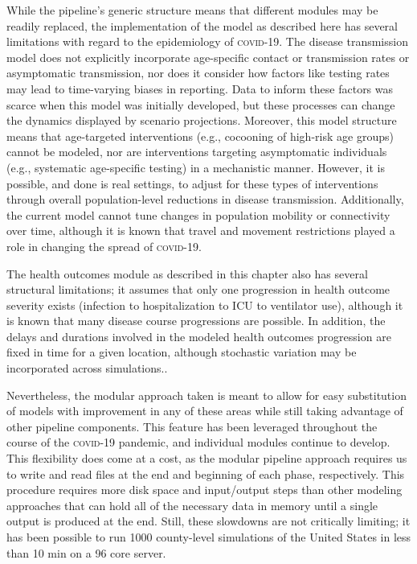 While the pipeline’s generic structure means that different modules may be readily replaced, the implementation of the model as described here has several limitations with regard to the epidemiology of \textsc{covid}-19. The disease transmission model does not explicitly incorporate age-specific contact or transmission rates or asymptomatic transmission, nor does it consider how factors like testing rates may lead to time-varying biases in reporting. Data to inform these factors was scarce when this model was initially developed, but these processes can change the dynamics displayed by scenario projections. Moreover, this model structure means that age-targeted interventions  (e.g., cocooning of high-risk age groups) cannot be modeled, nor are interventions targeting asymptomatic individuals (e.g., systematic age-specific testing) in a mechanistic manner. However, it is possible, and done is real settings, to adjust for these types of interventions through overall population-level reductions in disease transmission. Additionally, the current model cannot tune changes in population mobility or connectivity over time, although it is known that travel and movement restrictions played a role in changing the spread of \textsc{covid}-19.

The health outcomes module as described in this chapter also has several structural limitations; it assumes that only one progression in health outcome severity exists (infection to hospitalization to ICU to ventilator use), although it is known that many disease course progressions are possible. In addition, the delays and durations involved in the modeled health outcomes progression are fixed in time for a given location, although stochastic variation may be incorporated across simulations..

Nevertheless, the modular approach taken is meant to allow for easy substitution of models with improvement in any of these areas while still taking advantage of other pipeline components. This feature has been leveraged throughout the course of the \textsc{covid}-19 pandemic, and individual modules continue to develop. This flexibility does come at a cost, as the modular pipeline approach requires us to write and read files at the end and beginning of each phase, respectively. This procedure requires more disk space and input/output steps than other modeling approaches that can hold all of the necessary data in memory until a single output is produced at the end. Still, these slowdowns are not critically limiting; it has been possible to run 1000 county-level simulations of the United States in less than 10 min on a 96 core server.

